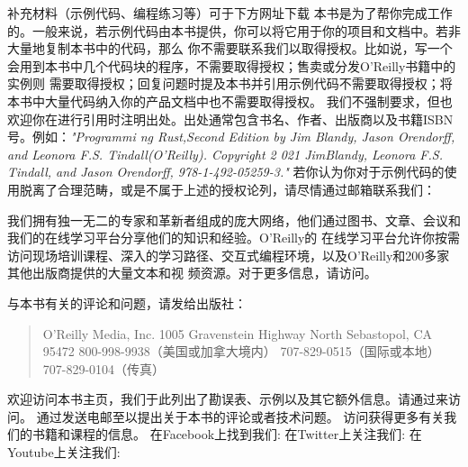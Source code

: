 
补充材料（示例代码、编程练习等）可于下方网址下载
本书是为了帮你完成工作的。一般来说，若示例代码由本书提供，你可以将它用于你的项目和文档中。若非大量地复制本书中的代码，那么
你不需要联系我们以取得授权。比如说，写一个会用到本书中几个代码块的程序，不需要取得授权；售卖或分发O'Reilly书籍中的实例则
需要取得授权；回复问题时提及本书并引用示例代码不需要取得授权；将本书中大量代码纳入你的产品文档中也不需要取得授权。
我们不强制要求，但也欢迎你在进行引用时注明出处。出处通常包含书名、作者、出版商以及书籍ISBN号。例如：\textit{"Programmi
ng Rust,Second Edition by Jim Blandy, Jason Orendorff, and Leonora F.S. Tindall(O'Reilly). Copyright 2
021 JimBlandy, Leonora F.S. Tindall, and Jason Orendorff, 978-1-492-05259-3."}
若你认为你对于示例代码的使用脱离了合理范畴，或是不属于上述的授权论列，请尽情通过邮箱联系我们：


我们拥有独一无二的专家和革新者组成的庞大网络，他们通过图书、文章、会议和我们的在线学习平台分享他们的知识和经验。O'Reilly的
在线学习平台允许你按需访问现场培训课程、深入的学习路径、交互式编程环境，以及O'Reilly和200多家其他出版商提供的大量文本和视
频资源。对于更多信息，请访问。


与本书有关的评论和问题，请发给出版社：
    \begin{quote}
        O'Reilly Media, Inc.
        1005 Gravenstein Highway North
        Sebastopol, CA 95472
        800-998-9938（美国或加拿大境内）
        707-829-0515（国际或本地）
        707-829-0104（传真）
    \end{quote}
欢迎访问本书主页，我们于此列出了勘误表、示例以及其它额外信息。请通过来访
问。
通过发送电邮至以提出关于本书的评论或者技术问题。
访问获得更多有关我们的书籍和课程的信息。
在Facebook上找到我们: 
在Twitter上关注我们: 
在Youtube上关注我们: 

